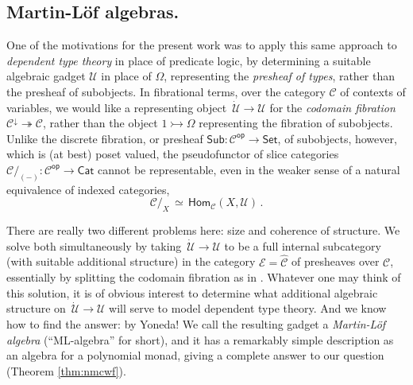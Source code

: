 \documentclass[12pt,reqno]{amsart}
\newcommand{\CC}{\ensuremath{\mathcal{C}}}
\newcommand{\EE}{\ensuremath{\mathcal{E}}}
\newcommand{\op}[1]{\ensuremath{{#1}^{\mathsf{op}}}}
\newcommand{\Set}{\ensuremath{\mathsf{Set}}}
\newcommand{\Hom}{\ensuremath{\mathsf{Hom}}}
\newcommand{\mono}{\ensuremath{\rightarrowtail}}
\renewcommand{\epi}{\ensuremath{\twoheadrightarrow}}
\renewcommand{\to}{\ensuremath{\rightarrow}}
\newcommand{\U}{\ensuremath{\mathcal{U}}}
\newcommand{\UU}{\ensuremath{\,\dot{\mathcal{U}}}}
\theoremstyle{remark}
\theoremstyle{definition}
\begin{document}
\subsection*{Martin-L\"of algebras.} One of the motivations for the present work was to apply this same approach to \emph{dependent type theory} in place of predicate logic, by determining a suitable algebraic gadget $\U$ in place of $\Omega$, representing the \emph{presheaf of types}, rather than the presheaf of subobjects.  In fibrational terms, over the category $\CC$ of contexts of variables, we would like a representing object $\UU \to \U$ for the \emph{codomain fibration} $\CC^\downarrow \epi \CC$, rather than the object $1\mono \Omega$ representing the fibration of subobjects.  Unlike the discrete fibration, or presheaf $\mathsf{Sub} : \op{\CC} \to \Set$, of subobjects, however, which is (at best) poset valued, the pseudofunctor of slice categories $\CC/_{\!(-)} : \op{\CC} \to \mathsf{Cat}$ cannot be representable, even in the weaker sense of a natural equivalence of indexed categories,
\[
\CC/_{X}\, \simeq\, \Hom_{\CC}(X, \U)\,.
\]

There are really two different problems here: size and coherence of structure.  We solve both simultaneously by taking $\UU \to \U$ to be a full internal subcategory (with suitable additional structure) in the category $\EE = \widehat{\CC}$ of presheaves over $\CC$, essentially by splitting the codomain fibration as in \cite{Lums-Warren}.  Whatever one may think of this solution, it is of obvious interest to determine what additional algebraic structure on $\UU \to \U$ will serve to model dependent type theory. And we know how to find the answer: by Yoneda!  We call the resulting gadget a \emph{Martin-L\"of algebra} (``ML-algebra'' for short), and it has a remarkably simple description as an algebra for a polynomial monad, giving a complete answer to our question (Theorem \ref{thm:nmcwf}).
\end{document}

